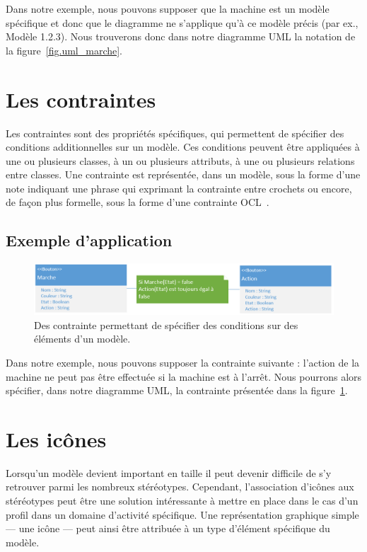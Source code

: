 Dans notre exemple, nous pouvons supposer que la machine est un modèle spécifique et donc que le diagramme ne s'applique qu'à ce modèle précis (par ex., Modèle 1.2.3).
Nous trouverons donc dans notre diagramme UML la notation de la figure~\ref{fig.uml_marche}.



\section{Les contraintes}
Les contraintes sont des propriétés spécifiques, qui permettent de sp\'ecifier des conditions additionnelles sur un modèle.
Ces conditions peuvent être appliquées à une ou plusieurs classes, à un ou plusieurs attributs, à une ou plusieurs relations entre classes.
Une contrainte est représent\'ee, dans un modèle, sous la forme d'une note indiquant une phrase qui exprimant la contrainte entre crochets ou encore, de fa\c{c}on plus formelle, sous la forme d'une contrainte OCL~\cite{OCL}.

\subsection{Exemple d'application}

\begin{figure}
    \begin{center}
    \includegraphics[width=12cm]{10_img/chap4/constraint.PNG}
    \caption{Des contrainte permettant de sp\'ecifier des conditions sur des \'el\'ements d'un modèle.}
    \label{fig.uml_con}
    \end{center}
\end{figure}

Dans notre exemple, nous pouvons supposer la contrainte suivante : l'action de la machine ne peut pas être effectuée si la machine est à l'arrêt.
Nous pourrons alors sp\'ecifier, dans notre diagramme UML, la contrainte présent\'ee dans la figure~\ref{fig.uml_con}.


\section{Les ic\^ones}
Lorsqu'un modèle devient important en taille il peut devenir difficile de s'y retrouver parmi les nombreux st\'er\'eotypes.
Cependant, l'association d'ic\^ones aux st\'er\'eotypes peut être une solution int\'eressante à mettre en place dans le cas d'un profil dans un domaine d'activité spécifique.
Une représentation graphique simple --- une ic\^one --- peut ainsi être attribuée à un type d'élément spécifique du modèle.

